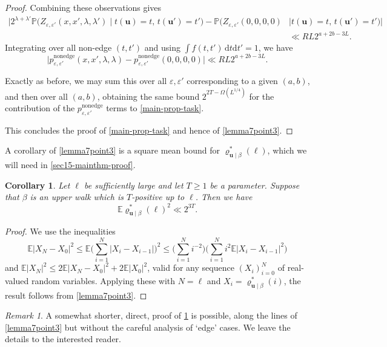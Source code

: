 \documentclass[11pt,reqno]{amsart}
\numberwithin{equation}{section}
\newtheorem{corollary}[theorem]{Corollary}
\theoremstyle{definition}
\theoremstyle{remark}
\newtheorem*{remark}{Remark}
\newcommand{\mb}{\mathbb}
\newcommand{\mbf}{\mathbf}
\newcommand\nonedge{\operatorname{nonedge}}
\newcommand{\eps}{\varepsilon}
\renewcommand{\le}{\leqslant}
\renewcommand{\ge}{\geqslant}
\begin{document}
\begin{proof}
Combining these observations gives 
\begin{align*} \Big|2^{\lambda + \lambda'}\mb{P}\big( Z_{\eps,\eps'}(x,x',\lambda,\lambda') \mid t(\mbf{u}) = t,\,t(\mbf{u}') = t'\big)  - \mb{P}\big(Z_{\eps,\eps'}(0,0,0,0) & \mid t(\mbf{u}) = t,\,t(\mbf{u}') = t'\big)\Big| \\ & \ll RL 2^{a + 2b - 3L}.\end{align*}
Integrating over all non-edge $(t,t')$ and using $\int f(t,t') \, \mathrm{d}t \mathrm{d}t' = 1$, we have
\[ \big| p^{\nonedge}_{\eps,\eps'}(x,x',\lambda,\lambda) - p^{\nonedge}_{\eps,\eps'}(0,0,0,0)\big| \ll RL 2^{a + 2b - 3L}.\]

Exactly as before, we may sum this over all $\eps, \eps'$ corresponding to a given $(a,b)$, and then over all $(a,b)$, obtaining the same bound $2^{2T - \Omega( L^{1/4})}$ for the contribution of the $p_{\eps,\eps'}^{\nonedge}$ terms to \cref{main-prop-task}. 

This concludes the proof of \cref{main-prop-task} and hence of \cref{lemma7point3}.
\end{proof}


A corollary of \cref{lemma7point3} is a square mean bound for $\varrho^*_{\mbf{u} \mid \beta}(\ell)$, which we will need in \cref{sec15-mainthm-proof}. 


\begin{corollary}
\label{rho-ell-2-bound} 
Let $\ell$ be sufficiently large and let $T \ge 1$ be a parameter. Suppose that $\beta$ is an upper walk which is $T$-positive up to $\ell$. Then we have \[ \mb{E}  \varrho^*_{\mbf{u} \mid \beta}(\ell)^2 \ll  2^{3T}.\]
\end{corollary}
\begin{proof}
We use the inequalities
\[ \mb{E} |X_N - X_0 |^2  \le\mb{E}\big(  \sum_{i = 1}^N |X_i - X_{i-1}|\big)^2  \le \big( \sum_{i =1}^N i^{-2} \big) \big(\sum_{i = 1}^N i^2 \mb{E} |X_i - X_{i - 1}|^2 \big)
\] and
$\mb{E} |X_N|^2 \le 2 \mb{E}|X_N - X_0|^2 + 2\mb{E}|X_0|^2$, valid for any sequence $(X_i)_{i = 0}^N$ of real-valued random variables. Applying these with $N = \ell$ and $X_i = \varrho^*_{\mbf{u} \mid \beta}(i)$, the result follows from \cref{lemma7point3}.
\end{proof}
\begin{remark}
A somewhat shorter, direct, proof of  \cref{rho-ell-2-bound} is possible, along the lines of \cref{lemma7point3} but without the careful analysis of `edge' cases. We leave the details to the interested reader.  
\end{remark}
\end{document}
